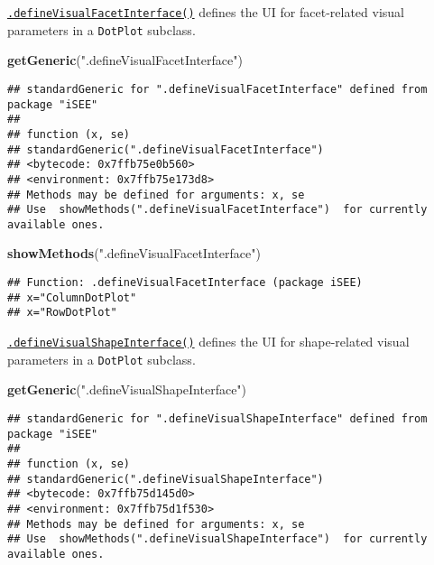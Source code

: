 \documentclass[
]{book}
\newenvironment{Shaded}{\begin{snugshade}}{\end{snugshade}}
\newcommand{\KeywordTok}[1]{\textcolor[rgb]{0.13,0.29,0.53}{\textbf{#1}}}
\newcommand{\NormalTok}[1]{#1}
\newcommand{\StringTok}[1]{\textcolor[rgb]{0.31,0.60,0.02}{#1}}
\begin{document}
\href{https://isee.github.io/iSEE/reference/visual-parameters-generics.html}{\texttt{.defineVisualFacetInterface()}} defines the UI for facet-related visual parameters in a \texttt{DotPlot} subclass.

\begin{Shaded}
\begin{Highlighting}[]
\KeywordTok{getGeneric}\NormalTok{(}\StringTok{".defineVisualFacetInterface"}\NormalTok{)}
\end{Highlighting}
\end{Shaded}

\begin{verbatim}
## standardGeneric for ".defineVisualFacetInterface" defined from package "iSEE"
## 
## function (x, se) 
## standardGeneric(".defineVisualFacetInterface")
## <bytecode: 0x7ffb75e0b560>
## <environment: 0x7ffb75e173d8>
## Methods may be defined for arguments: x, se
## Use  showMethods(".defineVisualFacetInterface")  for currently available ones.
\end{verbatim}

\begin{Shaded}
\begin{Highlighting}[]
\KeywordTok{showMethods}\NormalTok{(}\StringTok{".defineVisualFacetInterface"}\NormalTok{)}
\end{Highlighting}
\end{Shaded}

\begin{verbatim}
## Function: .defineVisualFacetInterface (package iSEE)
## x="ColumnDotPlot"
## x="RowDotPlot"
\end{verbatim}

\href{https://isee.github.io/iSEE/reference/visual-parameters-generics.html}{\texttt{.defineVisualShapeInterface()}} defines the UI for shape-related visual parameters in a \texttt{DotPlot} subclass.

\begin{Shaded}
\begin{Highlighting}[]
\KeywordTok{getGeneric}\NormalTok{(}\StringTok{".defineVisualShapeInterface"}\NormalTok{)}
\end{Highlighting}
\end{Shaded}

\begin{verbatim}
## standardGeneric for ".defineVisualShapeInterface" defined from package "iSEE"
## 
## function (x, se) 
## standardGeneric(".defineVisualShapeInterface")
## <bytecode: 0x7ffb75d145d0>
## <environment: 0x7ffb75d1f530>
## Methods may be defined for arguments: x, se
## Use  showMethods(".defineVisualShapeInterface")  for currently available ones.
\end{verbatim}
\end{document}

